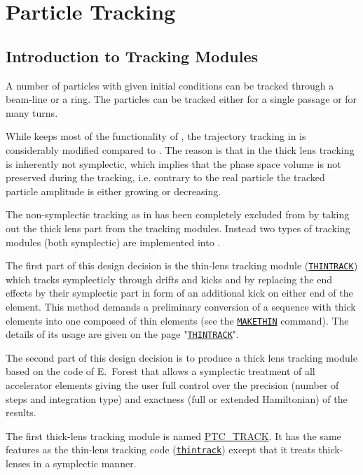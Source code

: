 \chapter{Particle Tracking}
\label{chap:tracking}\label{chap:thintrack}


\section{Introduction to \madx Tracking Modules}
\label{sec:trackintro}

A number of particles with given initial conditions can be tracked
through a beam-line or a ring. The particles can be tracked either for a
single passage or for many turns.  


While \madx keeps most of the functionality of \madeight, the
trajectory tracking in \madx is considerably modified compared to
\madeight. 
The reason is that in \madeight the thick lens tracking is inherently not
symplectic, which implies that the phase space volume is not preserved
during the tracking, i.e. contrary to the real particle the tracked
particle amplitude is either growing or decreasing. 


The non-symplectic tracking as in \madeight has been completely excluded
from \madx by taking out the thick lens part from the tracking
modules. Instead two types of tracking modules (both symplectic) are
implemented into \madx. 


The first part of this design decision is the thin-lens tracking module
(\href{../thintrack/thintrack.html}{\tt THINTRACK})  which tracks
symplecticly through drifts and kicks and by replacing the end effects
by their symplectic part in form of an additional kick on either  end of
the element. This method demands a preliminary conversion of a sequence
with thick elements into one composed of thin elements (see the
\hyperref[chap:makethin]{\tt MAKETHIN} command). The
details of its usage are given on the page
"\href{../thintrack/thintrack.html}{\tt THINTRACK}". 


The second part of this design decision is to produce a thick lens
tracking module based on the \ptc code of E.~Forest that
allows a symplectic treatment of all accelerator elements giving the
user full control over the precision (number of steps and integration
type) and exactness (full or extended Hamiltonian) of the results. 


The first \ptc thick-lens tracking module is named
\hyperref[sec:ptc_track]{PTC\_TRACK}. 
It has the same features as the thin-lens tracking code
({\tt \href{../thintrack/thintrack.html}{thintrack}}) except that it
treats thick-lenses in a symplectic manner. 


